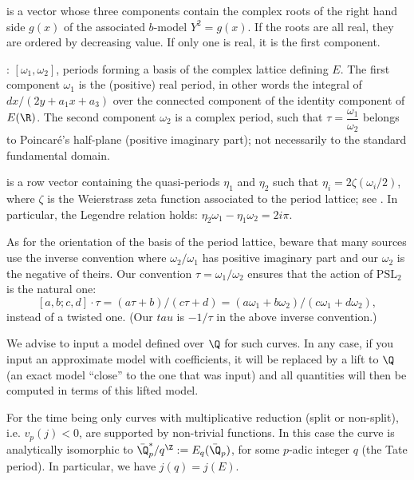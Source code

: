 \item {} is a vector whose three components contain the complex
roots of the right hand side $g(x)$ of the associated $b$-model $Y^2 = g(x)$.
If the roots are all real, they are ordered by decreasing value. If only one
is real, it is the first component.

\item {}: $[\omega_1,\omega_2]$, periods forming a basis of the
complex lattice defining $E$. The first component $\omega_1$ is the
(positive) real period, in other words the integral of $dx/(2y+a_1x+a_3)$
over the connected component of the identity component of $E(\R)$.
The second component $\omega_2$ is a complex period, such that
$\tau=\dfrac{\omega_1}{\omega_2}$ belongs to Poincar\'e's
half-plane (positive imaginary part); not necessarily to the standard
fundamental domain.

\item {} is a row vector containing the quasi-periods $\eta_1$ and
$\eta_2$ such that $\eta_i = 2\zeta(\omega_i/2)$, where $\zeta$ is the
Weierstrass zeta function associated to the period lattice; see
. In particular, the Legendre relation holds: $\eta_2\omega_1 -
\eta_1\omega_2 = 2i\pi$.

 As for the orientation of the basis of the period lattice,
beware that many sources use the inverse convention where $\omega_2/\omega_1$
has positive imaginary part and our $\omega_2$ is the negative of theirs. Our
convention $\tau = \omega_1/\omega_2$  ensures that the action of $\text{PSL}_2$ is the natural
one:
$$[a,b;c,d]\cdot\tau = (a\tau+b)/(c\tau+d)
  = (a \omega_1 + b\omega_2)/(c\omega_1 + d\omega_2),$$
instead of a twisted one. (Our $tau$ is $-1/\tau$ in the above inverse
convention.)


We advise to input a model defined over $\Q$ for such curves. In any case,
if you input an approximate model with  coefficients, it will be
replaced by a lift to $\Q$ (an exact model ``close'' to the one that was
input) and all quantities will then be computed in terms of this lifted
model.

For the time being only curves with multiplicative reduction (split or
non-split), i.e. $v_p(j) < 0$, are supported by non-trivial functions. In
this case the curve is analytically isomorphic to $\bar{\Q}_p^*/q^\Z :=
E_q(\bar{\Q}_p)$, for some $p$-adic integer $q$ (the Tate period). In
particular, we have $j(q) = j(E)$.


